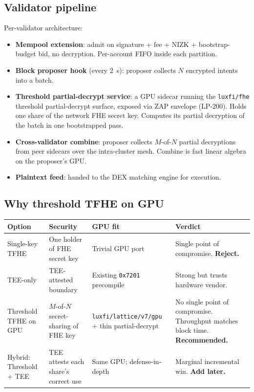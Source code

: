\documentclass[11pt,a4paper]{article}
\begin{document}
\subsection{Validator pipeline}

Per-validator architecture:

\begin{itemize}[nosep]
\item \textbf{Mempool extension}: admit on signature + fee + NIZK
  + bootstrap-budget bid, no decryption. Per-account FIFO inside
  each partition.
\item \textbf{Block proposer hook} (every 2~s): proposer collects
  $N$ encrypted intents into a batch.
\item \textbf{Threshold partial-decrypt service}: a GPU sidecar
  running the \texttt{luxfi/fhe} threshold partial-decrypt
  surface, exposed via ZAP envelope (LP-200). Holds one share of
  the network FHE secret key. Computes its partial decryption of
  the batch in one bootstrapped pass.
\item \textbf{Cross-validator combine}: proposer collects
  $M$-of-$N$ partial decryptions from peer sidecars over the
  intra-cluster mesh. Combine is fast linear algebra on the
  proposer's GPU.
\item \textbf{Plaintext feed}: handed to the DEX matching engine
  for execution.
\end{itemize}

\subsection{Why threshold TFHE on GPU}

\begin{longtable}{p{3.8cm}p{4.2cm}p{2.4cm}p{4.4cm}}
\toprule
\textbf{Option} & \textbf{Security} & \textbf{GPU fit} & \textbf{Verdict} \\
\midrule
Single-key TFHE &
  One holder of FHE secret key &
  Trivial GPU port &
  Single point of compromise. \textbf{Reject.} \\
TEE-only &
  TEE-attested boundary &
  Existing \texttt{0x7201} precompile &
  Strong but trusts hardware vendor. \\
Threshold TFHE on GPU &
  $M$-of-$N$ secret-sharing of FHE key &
  \texttt{luxfi/lattice/v7/gpu} + thin partial-decrypt &
  No single point of compromise. Throughput matches block
  time. \textbf{Recommended.} \\
Hybrid: Threshold + TEE &
  TEE attests each share's correct use &
  Same GPU; defense-in-depth &
  Marginal incremental win. \textbf{Add later.} \\
\bottomrule
\end{longtable}
\end{document}
